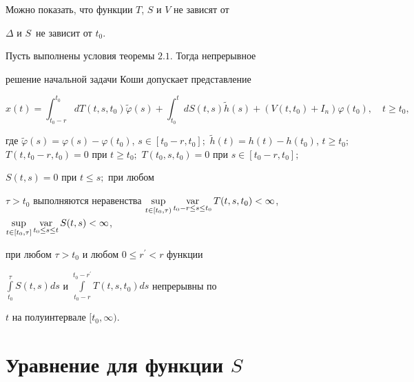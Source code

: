 Можно показать, что функции $T$, $S$ и $V$ не зависят от


$\Delta$ и $S$\ не зависит от $t_{0}$.





\begin{thms}


Пусть выполнены условия теоремы $2.1$. Тогда непрерывное 


решение начальной задачи Коши допускает представление


$$


x (t)=\int_{t_{0}-r}^{t_{0}}dT (t,s,t_{0})


\widetilde{\varphi} (s) +\int_{t_{0}}^{t}dS (t,s)


\widetilde{h} (s) + (V (t,t_{0})


+I_{n}) \varphi (t_{0}),\quad t\geq t_{0},


$$


где $\widetilde{\varphi} (s)=\varphi (s)


-\varphi (t_{0}) $, $s\in [t_{0}-r,t_{0}];$ $\widetilde{h} (t)=h (t) -h (


t_{0}) $, $t\geq t_{0};$ $T (t,t_{0}


-r,t_{0})=0$ при $t\geq t_{0};$ $T (


t_{0},s,t_{0})=0$  при $s\in [t_{0}-r,t_{0}];$


$S (t,s)=0$ при $t\leq s;$ при любом


$\tau>t_{0}$ выполняются неравенства $\sup\limits_{t\in [


t_{0},\tau) }\Var\limits_{t_{0}-r\leq s\leq t_{0}}T (


t,s,t_{0}) <\infty$, $\sup\limits_{t\in [t_{0},\tau]


}\Var\limits_{t_{0}\leq s\leq t}S (t,s) <\infty$,


при любом $\tau>t_{0}$ и любом $0\leq r^{\prime}<r$ функции


$\int\limits_{t_{0}}^{\tau}S (t,s) ds$  и $\int\limits_{t_{0}


-r}^{t_{0}-r^{\prime}}T (t,s,t_{0}) ds$ непрерывны по


$t$ на полуинтервале $ [t_{0},\infty) $.


\end{thms}








\section{Уравнение для функции $S$}





